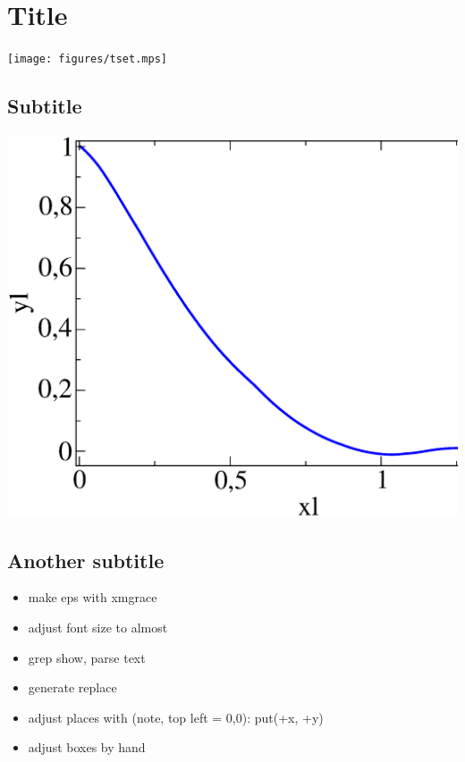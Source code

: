 \documentclass{article}
\begin{document}
\section{Title}

\texttt{[image: figures/tset.mps]}


\subsection{Subtitle}

{
\includegraphics[width=\textwidth]{figures/test.eps}
}
\subsection{Another subtitle}

\begin{itemize}
  \item make eps with xmgrace
  \item adjust font size to almost
  \item grep show, parse text
  \item generate replace
  \item adjust places with (note, top left = 0,0): put(+x, +y) 
  \item adjust boxes by hand
\end{itemize}
\end{document}
